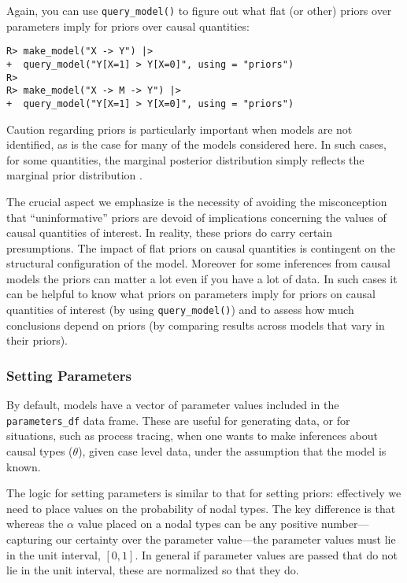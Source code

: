 \documentclass[
  11pt,
  article]{jss}
\begin{document}
Again, you can use \texttt{query\_model()} to figure out what flat (or
other) priors over parameters imply for priors over causal quantities:

\begin{verbatim}
R> make_model("X -> Y") |>
+  query_model("Y[X=1] > Y[X=0]", using = "priors")
R> 
R> make_model("X -> M -> Y") |>
+  query_model("Y[X=1] > Y[X=0]", using = "priors")
\end{verbatim}

Caution regarding priors is particularly important when models are not
identified, as is the case for many of the models considered here. In
such cases, for some quantities, the marginal posterior distribution
simply reflects the marginal prior distribution
\citep{poirier_revising_1998}.

The crucial aspect we emphasize is the necessity of avoiding the
misconception that ``uninformative'' priors are devoid of implications
concerning the values of causal quantities of interest. In reality,
these priors do carry certain presumptions. The impact of flat priors on
causal quantities is contingent on the structural configuration of the
model. Moreover for some inferences from causal models the priors can
matter a lot even if you have a lot of data. In such cases it can be
helpful to know what priors on parameters imply for priors on causal
quantities of interest (by using \texttt{query\_model()}) and to assess
how much conclusions depend on priors (by comparing results across
models that vary in their priors).

\hypertarget{parameters}{%
\subsubsection{Setting Parameters}\label{parameters}}

By default, models have a vector of parameter values included in the
\texttt{parameters\_df} data frame. These are useful for generating
data, or for situations, such as process tracing, when one wants to make
inferences about causal types (\(\theta\)), given case level data, under
the assumption that the model is known.

The logic for setting parameters is similar to that for setting priors:
effectively we need to place values on the probability of nodal types.
The key difference is that whereas the \(\alpha\) value placed on a
nodal types can be any positive number---capturing our certainty over
the parameter value---the parameter values must lie in the unit
interval, \([0,1]\). In general if parameter values are passed that do
not lie in the unit interval, these are normalized so that they do.
\end{document}
